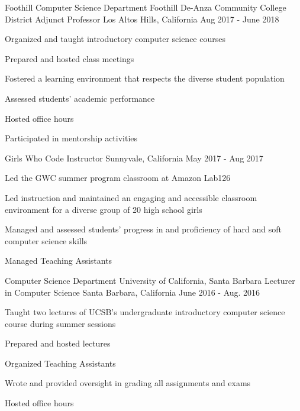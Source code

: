 \begin{cventries}

  \cventry
{Foothill Computer Science Department \newline Foothill De-Anza Community College District}
    {Adjunct Professor}
    {Los Altos Hills, California}
    {Aug 2017 - June 2018}
    {
      \begin{cvitems}
	\item {Organized and taught introductory computer science courses}\\
	\begin{cvitems}
         \item Prepared and hosted class meetings
                  \item Fostered a learning environment that respects the diverse student population
		\item Assessed students' academic performance
		\item Hosted office hours
	\end{cvitems}
	\vspace{2mm}
	\item Participated in mentorship activities
      \end{cvitems}
    }

  \cventry
{Girls Who Code}
    {Instructor}
    {Sunnyvale, California}
    {May 2017 - Aug 2017}
    {
      \begin{cvitems}
	\item {Led the GWC summer program classroom at Amazon Lab126}\\
	\begin{cvitems}
        \item Led instruction and maintained an engaging and accessible classroom environment for a diverse group of 20 high school girls
	\item Managed and assessed students’ progress in and proficiency of hard and soft computer science skills
	\item Managed Teaching Assistants
	\end{cvitems}
      \end{cvitems}
    }

  \cventry
{Computer Science Department \newline University of California, Santa Barbara}
    {Lecturer in Computer Science}
    {Santa Barbara, California}
    {June 2016 - Aug. 2016}
    {
      \begin{cvitems}
	\item {Taught two lectures of UCSB's undergraduate introductory computer science course during summer sessions}\\
	\begin{cvitems}
        \item Prepared and hosted lectures
	\item Organized Teaching Assistants
	\item Wrote and provided oversight in grading all assignments and exams
	\item Hosted office hours 
	\end{cvitems}
      \end{cvitems}
    }


\end{cventries}
